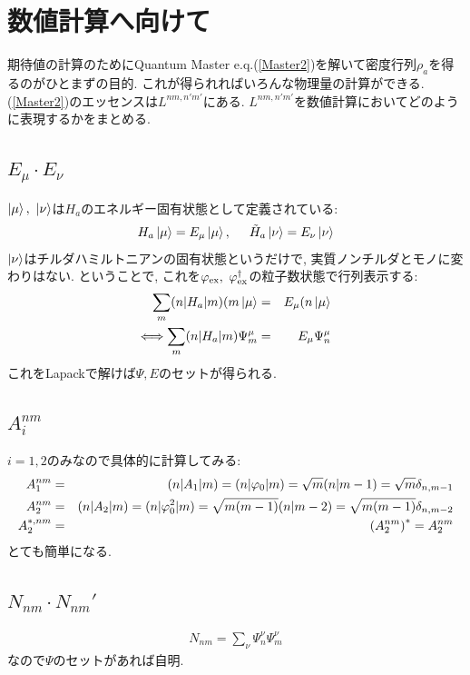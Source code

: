 \documentclass[10.5pt,a4paper]{jreport}
\newcommand{\pbra}[1]{( #1 |}
\newcommand{\pket}[1]{| #1 )}
\begin{document}
\section{数値計算へ向けて}
期待値の計算のためにQuantum Master e.q.(\ref{Master2})を解いて密度行列$\rho_a$を得るのがひとまずの目的. これが得られればいろんな物理量の計算ができる. (\ref{Master2})のエッセンスは$L^{nm, n'm'}$にある. $L^{nm, n'm'}$を数値計算においてどのように表現するかをまとめる.
\subsection{$E_\mu\cdot E_\nu$}
$\ket{\mu},\ \ket{\nu}$は$H_a$のエネルギー固有状態として定義されている:
\begin{eqnarray}
  H_a\ket{\mu} = E_\mu\ket{\mu},\hspace{0.5cm}\tilde{H}_a\ket{\nu} = E_\nu\ket{\nu}
\end{eqnarray}
$\ket{\nu}$はチルダハミルトニアンの固有状態というだけで, 実質ノンチルダとモノに変わりはない. ということで, これを$\varphi_{\rm ex},\ \varphi_{\rm ex}^\dagger$の粒子数状態で行列表示する:
\begin{eqnarray}
  \sum_m\pbra{n}H_a\pket{m}(m\ket{\mu} &=& E_\mu(n\ket{\mu}\\
\Longleftrightarrow  \sum_m\pbra{n}H_a\pket{m}\Psi_m^\mu &=& E_\mu\Psi_n^\mu
\end{eqnarray}
これをLapackで解けば$\Psi, E$のセットが得られる.
\subsection{$A_i^{nm}$}
$i = 1, 2$のみなので具体的に計算してみる:
\begin{eqnarray}
  A_1^{nm} &=& \pbra{n}A_1\pket{m} = \pbra{n}\varphi_0\pket{m} = \sqrt{m}(n|m-1) = \sqrt{m}\delta_{n, m-1}\\
  A_2^{nm} &=& \pbra{n}A_2\pket{m} = \pbra{n}\varphi_0^2\pket{m} = \sqrt{m(m-1)}(n|m-2) = \sqrt{m(m-1)}\delta_{n, m-2}\\
  A_2^{*, nm} &=& \pqty{A_2^{nm}}^* = A_2^{nm}
\end{eqnarray}
とても簡単になる.
\subsection{$N_{nm}\cdot N_{nm}'$}
\begin{eqnarray}
  N_{nm} = \sum_\nu\Psi_n^\nu\Psi_m^\nu
\end{eqnarray}
なので$\Psi$のセットがあれば自明.
\end{document}
